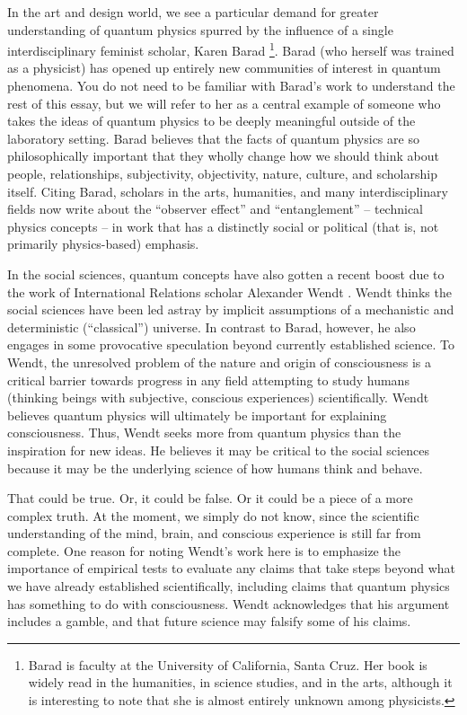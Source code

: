 \documentclass[12pt,onecolumn,preprintnumbers,amsmath,amssymbn,reprint,nofootinbib,superscriptaddress]{revtex4}    %
\begin{document}
In the art and design world, we see a particular demand for greater understanding of quantum physics spurred by the influence of a single interdisciplinary feminist scholar, Karen Barad \cite{Barad}\footnote{Barad is faculty at the University of California, Santa Cruz.  Her book \cite{Barad} is widely read in the humanities, in science studies, and in the arts, although it is interesting to note that she is almost entirely unknown among physicists.}.  Barad (who herself was trained as a physicist) has opened up entirely new communities of interest in quantum phenomena.  You do not need to be familiar with Barad's work to understand the rest of this essay, but we will refer to her as a central example of someone who takes the ideas of quantum physics to be deeply meaningful outside of the laboratory setting.  Barad believes that the facts of quantum physics are so philosophically important that they wholly change how we should think about people, relationships, subjectivity, objectivity, nature, culture, and scholarship itself. Citing Barad, scholars in the arts, humanities, and many interdisciplinary fields now write about the ``observer effect'' and ``entanglement'' -- technical physics concepts -- in work that has a distinctly social or political (that is, not primarily physics-based) emphasis.  

In the social sciences, quantum concepts have also gotten a recent boost due to the work of International Relations scholar Alexander Wendt \cite{Wendt}. Wendt thinks the social sciences have been led astray by implicit assumptions of a mechanistic and deterministic (``classical'') universe.  In contrast to Barad, however, he also engages in some provocative speculation beyond currently established science. To Wendt, the unresolved problem of the nature and origin of consciousness is a critical barrier towards progress in any field attempting to study humans (thinking beings with subjective, conscious experiences) scientifically.  Wendt believes quantum physics will ultimately be important for explaining consciousness.  Thus, Wendt seeks more from quantum physics than the inspiration for new ideas.  He believes it may be critical to the social sciences because it may be the underlying science of how humans think and behave.  

That could be true.  Or, it could be false.  Or it could be a piece of a more complex truth.  At the moment, we simply do not know, since the scientific understanding of the mind, brain, and conscious experience is still far from complete.  One reason for noting Wendt's work here is to emphasize the importance of empirical tests to evaluate any claims that take steps beyond what we have already established scientifically, including claims that quantum physics has something to do with consciousness. Wendt acknowledges that his argument includes a gamble, and that future science may falsify some of his claims.  
\end{document}
